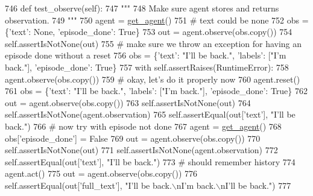 \begin{DoxyCode}
746     \textcolor{keyword}{def }test\_observe(self):
747         \textcolor{stringliteral}{"""}
748 \textcolor{stringliteral}{        Make sure agent stores and returns observation.}
749 \textcolor{stringliteral}{        """}
750         agent = \hyperlink{namespacetests_1_1test__torch__agent_ae929d109305aaea29fbfa13ecf1f32e9}{get\_agent}()
751         \textcolor{comment}{# text could be none}
752         obs = \{\textcolor{stringliteral}{'text'}: \textcolor{keywordtype}{None}, \textcolor{stringliteral}{'episode\_done'}: \textcolor{keyword}{True}\}
753         out = agent.observe(obs.copy())
754         self.assertIsNotNone(out)
755         \textcolor{comment}{# make sure we throw an exception for having an episode done without a reset}
756         obs = \{\textcolor{stringliteral}{'text'}: \textcolor{stringliteral}{"I'll be back."}, \textcolor{stringliteral}{'labels'}: [\textcolor{stringliteral}{"I'm back."}], \textcolor{stringliteral}{'episode\_done'}: \textcolor{keyword}{True}\}
757         with self.assertRaises(RuntimeError):
758             agent.observe(obs.copy())
759         \textcolor{comment}{# okay, let's do it properly now}
760         agent.reset()
761         obs = \{\textcolor{stringliteral}{'text'}: \textcolor{stringliteral}{"I'll be back."}, \textcolor{stringliteral}{'labels'}: [\textcolor{stringliteral}{"I'm back."}], \textcolor{stringliteral}{'episode\_done'}: \textcolor{keyword}{True}\}
762         out = agent.observe(obs.copy())
763         self.assertIsNotNone(out)
764         self.assertIsNotNone(agent.observation)
765         self.assertEqual(out[\textcolor{stringliteral}{'text'}], \textcolor{stringliteral}{"I'll be back."})
766         \textcolor{comment}{# now try with episode not done}
767         agent = \hyperlink{namespacetests_1_1test__torch__agent_ae929d109305aaea29fbfa13ecf1f32e9}{get\_agent}()
768         obs[\textcolor{stringliteral}{'episode\_done'}] = \textcolor{keyword}{False}
769         out = agent.observe(obs.copy())
770         self.assertIsNotNone(out)
771         self.assertIsNotNone(agent.observation)
772         self.assertEqual(out[\textcolor{stringliteral}{'text'}], \textcolor{stringliteral}{"I'll be back."})
773         \textcolor{comment}{# should remember history}
774         agent.act()
775         out = agent.observe(obs.copy())
776         self.assertEqual(out[\textcolor{stringliteral}{'full\_text'}], \textcolor{stringliteral}{"I'll be back.\(\backslash\)nI'm back.\(\backslash\)nI'll be back."})
777 
\end{DoxyCode}
\mbox{\label{classtests_1_1test__torch__agent_1_1TestTorchAgent_a7135ee3421b1d0fc98f0202718910482}} 
